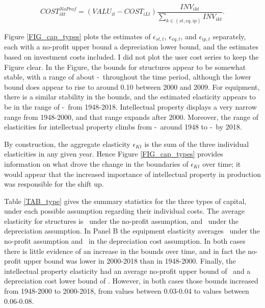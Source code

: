 \documentclass[11pt]{article}
\begin{document}
\begin{equation}
    COST_{ikt}^{NoProf} = \left(VALU_{it} - COST_{iLt}\right)\frac{INV_{ikt}}{\sum_{k \in (st,eq,ip)} INV_{ikt}}.
\end{equation}

Figure \ref{FIG_cap_types} plots the estimates of $\epsilon_{st,t}$, $\epsilon_{eq,t}$, and $\epsilon_{ip,t}$ separately, each with a no-profit upper bound a depreciation lower bound, and the estimates based on investment costs included. I did not plot the user cost series to keep the Figure clear. In the Figure, the bounds for structures appear to be somewhat stable, with a range of about \basestdepr-\basetnoprofit \ throughout the time period, although the lower bound does appear to rise to around 0.10 between 2000 and 2009. For equipment, there is a similar stability in the bounds, and the estimated elasticity appears to be in the range of \baseeqdepr-\baseeqnoprofit \ from 1948-2018. Intellectual property displays a very narrow range from 1948-2000, and that range expands after 2000. Moreover, the range of elasticities for intellectual property climbs from \baseipearlydepr-\baseipearlynoprofit \ around 1948 to \baseiplatedepr-\baseiplatenoprofit \ by 2018.

By construction, the aggregate elasticity $\epsilon_{Kt}$ is the sum of the three individual elasticities in any given year. Hence Figure \ref{FIG_cap_types} provides information on what drove the change in the boundaries of $\epsilon_{Kt}$ over time; it would appear that the increased importance of intellectual property in production was responsible for the shift up.

Table \ref{TAB_type} gives the summary statistics for the three types of capital, under each possible assumption regarding their individual costs. The average elasticity for structures is \basetnoprofit \ under the no-profit assumption, and \basestdepr \ under the depreciation assumption. In Panel B the equipment elasticity averages \baseeqnoprofit \ under the no-profit assumption and \baseeqdepr \ in the depreciation cost assumption. In both cases there is little evidence of an increase in the bounds over time, and in fact the no-profit upper bound was lower in 2000-2018 than in 1948-2000. Finally, the intellectual property elasticity had an average no-profit upper bound of \baseipnoprofit \ and a depreciation cost lower bound of \baseipdepr. However, in both cases those bounds increased from 1948-2000 to 2000-2018, from values between 0.03-0.04 to values between 0.06-0.08. 
\end{document}
